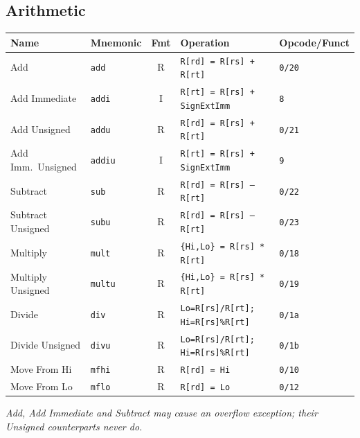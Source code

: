 \documentclass[10pt]{article}
\newcommand{\op}[1]{\texttt{#1}}
\begin{document}
\subsection{Arithmetic}
\begin{center}
\small
\begin{tabular}{@{}p{2.7cm}p{1.6cm}cp{5.4cm}l@{}}
\toprule
Name & Mnemonic & Fmt & Operation & Opcode/Funct \\
\midrule
Add                 & \op{add}  & R & \op{R[rd] = R[rs] + R[rt]} & \op{0/20} \\
Add Immediate       & \op{addi} & I & \op{R[rt] = R[rs] + SignExtImm} & \op{8} \\
Add Unsigned        & \op{addu} & R & \op{R[rd] = R[rs] + R[rt]} & \op{0/21} \\
Add Imm.\ Unsigned  & \op{addiu}& I & \op{R[rt] = R[rs] + SignExtImm} & \op{9} \\
Subtract            & \op{sub}  & R & \op{R[rd] = R[rs] -- R[rt]} & \op{0/22} \\
Subtract Unsigned   & \op{subu} & R & \op{R[rd] = R[rs] -- R[rt]} & \op{0/23} \\
Multiply            & \op{mult} & R & \op{\{Hi,Lo\} = R[rs] * R[rt]} & \op{0/18} \\
Multiply Unsigned   & \op{multu}& R & \op{\{Hi,Lo\} = R[rs] * R[rt]} & \op{0/19} \\
Divide              & \op{div}  & R & \op{Lo=R[rs]/R[rt]; Hi=R[rs]\%R[rt]} & \op{0/1a} \\
Divide Unsigned     & \op{divu} & R & \op{Lo=R[rs]/R[rt]; Hi=R[rs]\%R[rt]} & \op{0/1b} \\
Move From Hi        & \op{mfhi} & R & \op{R[rd] = Hi} & \op{0/10} \\
Move From Lo        & \op{mflo} & R & \op{R[rd] = Lo} & \op{0/12} \\
\bottomrule
\end{tabular}
\end{center}
\emph{Add, Add Immediate and Subtract may cause an overflow exception;
their Unsigned counterparts never do.}
\end{document}
